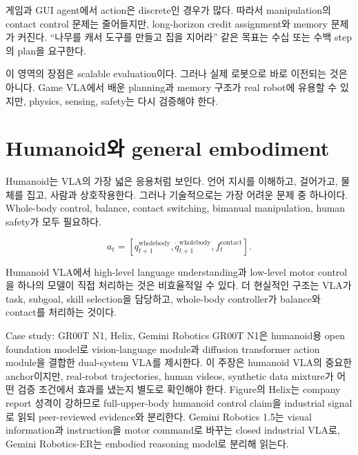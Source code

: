 게임과 GUI agent에서 action은 discrete인 경우가 많다. 따라서 manipulation의 contact control 문제는 줄어들지만, long-horizon credit assignment와 memory 문제가 커진다. ``나무를 캐서 도구를 만들고 집을 지어라'' 같은 목표는 수십 또는 수백 step의 plan을 요구한다.

이 영역의 장점은 scalable evaluation이다. 그러나 실제 로봇으로 바로 이전되는 것은 아니다. Game VLA에서 배운 planning과 memory 구조가 real robot에 유용할 수 있지만, physics, sensing, safety는 다시 검증해야 한다.

\section{Humanoid와 general embodiment}

Humanoid는 VLA의 가장 넓은 응용처럼 보인다. 언어 지시를 이해하고, 걸어가고, 물체를 집고, 사람과 상호작용한다. 그러나 기술적으로는 가장 어려운 문제 중 하나이다. Whole-body control, balance, contact switching, bimanual manipulation, human safety가 모두 필요하다.

\begin{equation}
  a_t =
  \left[
    q_{t+1}^{\mathrm{wholebody}},
    \dot{q}_{t+1}^{\mathrm{wholebody}},
    f_t^{\mathrm{contact}}
  \right].
\end{equation}

Humanoid VLA에서 high-level language understanding과 low-level motor control을 하나의 모델이 직접 처리하는 것은 비효율적일 수 있다. 더 현실적인 구조는 VLA가 task, subgoal, skill selection을 담당하고, whole-body controller가 balance와 contact를 처리하는 것이다.

\begin{casebox}{Case study: GR00T N1, Helix, Gemini Robotics}
GR00T N1은 humanoid용 open foundation model로 vision-language module과 diffusion transformer action module을 결합한 dual-system VLA를 제시한다. 이 주장은 humanoid VLA의 중요한 anchor이지만, real-robot trajectories, human videos, synthetic data mixture가 어떤 검증 조건에서 효과를 냈는지 별도로 확인해야 한다. Figure의 Helix는 company report 성격이 강하므로 full-upper-body humanoid control claim을 industrial signal로 읽되 peer-reviewed evidence와 분리한다. Gemini Robotics 1.5는 visual information과 instruction을 motor command로 바꾸는 closed industrial VLA로, Gemini Robotics-ER는 embodied reasoning model로 분리해 읽는다.
\end{casebox}

